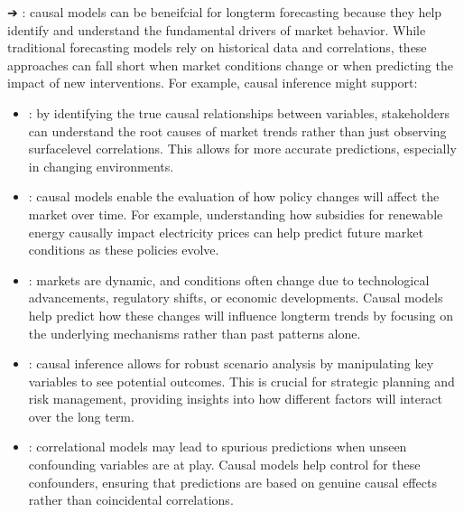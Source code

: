 \documentclass[letterpaper,10pt,english]{jupyterBook}
\begin{document}
\sphinxAtStartPar
➔ : causal models can be beneifcial for long\sphinxhyphen{}term forecasting because they help identify and understand the fundamental drivers of market behavior. While traditional forecasting models rely on historical data and correlations, these approaches can fall short when market conditions change or when predicting the impact of new interventions. For example, causal inference might support:
\begin{itemize}
\item {} 
\sphinxAtStartPar
{}: by identifying the true causal relationships between variables, stakeholders can understand the root causes of market trends rather than just observing surface\sphinxhyphen{}level correlations. This allows for more accurate predictions, especially in changing environments.

\item {} 
\sphinxAtStartPar
{}: causal models enable the evaluation of how policy changes will affect the market over time. For example, understanding how subsidies for renewable energy causally impact electricity prices can help predict future market conditions as these policies evolve.

\item {} 
\sphinxAtStartPar
{}: markets are dynamic, and conditions often change due to technological advancements, regulatory shifts, or economic developments. Causal models help predict how these changes will influence long\sphinxhyphen{}term trends by focusing on the underlying mechanisms rather than past patterns alone.

\item {} 
\sphinxAtStartPar
{}: causal inference allows for robust scenario analysis by manipulating key variables to see potential outcomes. This is crucial for strategic planning and risk management, providing insights into how different factors will interact over the long term.

\item {} 
\sphinxAtStartPar
{}: correlational models may lead to spurious predictions when unseen confounding variables are at play. Causal models help control for these confounders, ensuring that predictions are based on genuine causal effects rather than coincidental correlations.

\end{itemize}
\end{document}
